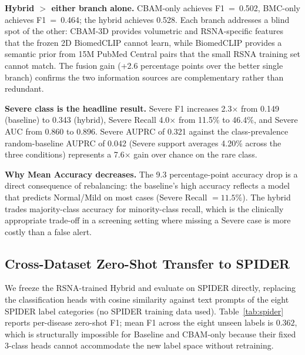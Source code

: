 \documentclass[runningheads]{llncs}
\begin{document}
\textbf{Hybrid $>$ either branch alone.} CBAM-only achieves F1~=~0.502,
BMC-only achieves F1~=~0.464; the hybrid achieves 0.528. Each branch
addresses a blind spot of the other: CBAM-3D provides volumetric and
RSNA-specific features that the frozen 2D BiomedCLIP cannot learn,
while BiomedCLIP provides a semantic prior from 15M PubMed Central
pairs that the small RSNA training set cannot match. The fusion gain
(+2.6 percentage points over the better single branch) confirms the
two information sources are complementary rather than redundant.

\textbf{Severe class is the headline result.} Severe F1 increases
2.3$\times$ from 0.149 (baseline) to 0.343 (hybrid), Severe Recall
4.0$\times$ from 11.5\% to 46.4\%, and Severe AUC from 0.860 to 0.896.
Severe AUPRC of 0.321 against the class-prevalence random-baseline AUPRC
of 0.042 (Severe support averages 4.20\% across the three conditions)
represents a 7.6$\times$ gain over chance on the rare class.

\textbf{Why Mean Accuracy decreases.} The 9.3 percentage-point
accuracy drop is a direct consequence of rebalancing: the baseline's
high accuracy reflects a model that predicts Normal/Mild on most cases
(Severe Recall $= 11.5\%$). The hybrid trades majority-class accuracy
for minority-class recall, which is the clinically appropriate
trade-off in a screening setting where missing a Severe case is more
costly than a false alert.

\subsection{Cross-Dataset Zero-Shot Transfer to SPIDER}

We freeze the RSNA-trained Hybrid and evaluate on SPIDER directly,
replacing the classification heads with cosine similarity against
text prompts of the eight SPIDER label categories (no SPIDER
training data used). Table~\ref{tab:spider} reports per-disease
zero-shot F1; mean F1 across the eight unseen labels is $0.362$,
which is structurally impossible for Baseline and CBAM-only because
their fixed 3-class heads cannot accommodate the new label space
without retraining.
\end{document}
